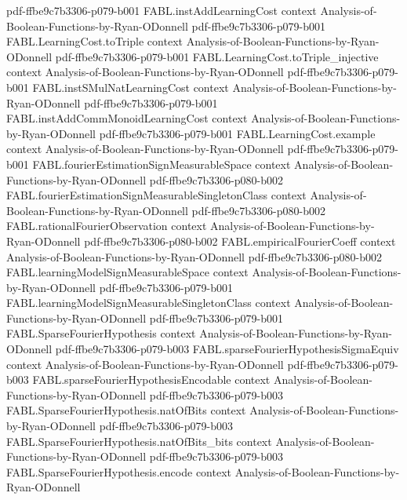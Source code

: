 \begin{theorem}
  {pdf-ffbe9c7b3306-p079-b001}
\proofstep
  {FABL.instAddLearningCost}
  {context}
  {Analysis-of-Boolean-Functions-by-Ryan-ODonnell}
  {pdf-ffbe9c7b3306-p079-b001}
\proofstep
  {FABL.LearningCost.toTriple}
  {context}
  {Analysis-of-Boolean-Functions-by-Ryan-ODonnell}
  {pdf-ffbe9c7b3306-p079-b001}
\proofstep
  {FABL.LearningCost.toTriple_injective}
  {context}
  {Analysis-of-Boolean-Functions-by-Ryan-ODonnell}
  {pdf-ffbe9c7b3306-p079-b001}
\proofstep
  {FABL.instSMulNatLearningCost}
  {context}
  {Analysis-of-Boolean-Functions-by-Ryan-ODonnell}
  {pdf-ffbe9c7b3306-p079-b001}
\proofstep
  {FABL.instAddCommMonoidLearningCost}
  {context}
  {Analysis-of-Boolean-Functions-by-Ryan-ODonnell}
  {pdf-ffbe9c7b3306-p079-b001}
\proofstep
  {FABL.LearningCost.example}
  {context}
  {Analysis-of-Boolean-Functions-by-Ryan-ODonnell}
  {pdf-ffbe9c7b3306-p079-b001}
\proofstep
  {FABL.fourierEstimationSignMeasurableSpace}
  {context}
  {Analysis-of-Boolean-Functions-by-Ryan-ODonnell}
  {pdf-ffbe9c7b3306-p080-b002}
\proofstep
  {FABL.fourierEstimationSignMeasurableSingletonClass}
  {context}
  {Analysis-of-Boolean-Functions-by-Ryan-ODonnell}
  {pdf-ffbe9c7b3306-p080-b002}
\proofstep
  {FABL.rationalFourierObservation}
  {context}
  {Analysis-of-Boolean-Functions-by-Ryan-ODonnell}
  {pdf-ffbe9c7b3306-p080-b002}
\proofstep
  {FABL.empiricalFourierCoeff}
  {context}
  {Analysis-of-Boolean-Functions-by-Ryan-ODonnell}
  {pdf-ffbe9c7b3306-p080-b002}
\proofstep
  {FABL.learningModelSignMeasurableSpace}
  {context}
  {Analysis-of-Boolean-Functions-by-Ryan-ODonnell}
  {pdf-ffbe9c7b3306-p079-b001}
\proofstep
  {FABL.learningModelSignMeasurableSingletonClass}
  {context}
  {Analysis-of-Boolean-Functions-by-Ryan-ODonnell}
  {pdf-ffbe9c7b3306-p079-b001}
\proofstep
  {FABL.SparseFourierHypothesis}
  {context}
  {Analysis-of-Boolean-Functions-by-Ryan-ODonnell}
  {pdf-ffbe9c7b3306-p079-b003}
\proofstep
  {FABL.sparseFourierHypothesisSigmaEquiv}
  {context}
  {Analysis-of-Boolean-Functions-by-Ryan-ODonnell}
  {pdf-ffbe9c7b3306-p079-b003}
\proofstep
  {FABL.sparseFourierHypothesisEncodable}
  {context}
  {Analysis-of-Boolean-Functions-by-Ryan-ODonnell}
  {pdf-ffbe9c7b3306-p079-b003}
\proofstep
  {FABL.SparseFourierHypothesis.natOfBits}
  {context}
  {Analysis-of-Boolean-Functions-by-Ryan-ODonnell}
  {pdf-ffbe9c7b3306-p079-b003}
\proofstep
  {FABL.SparseFourierHypothesis.natOfBits_bits}
  {context}
  {Analysis-of-Boolean-Functions-by-Ryan-ODonnell}
  {pdf-ffbe9c7b3306-p079-b003}
\proofstep
  {FABL.SparseFourierHypothesis.encode}
  {context}
  {Analysis-of-Boolean-Functions-by-Ryan-ODonnell}

\end{theorem}
